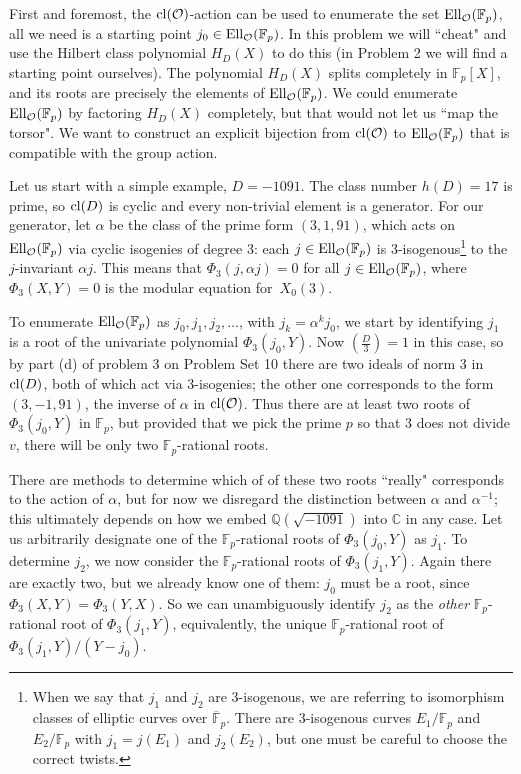 \documentclass[11pt]{article}
\newcommand{\Fp}{\mathbb{F}_p}
\newcommand{\Fpbar}{\overline{\mathbb{F}}_p}
\newcommand{\Q}{\mathbb{Q}}
\newcommand{\C}{\mathbb{C}}
\renewcommand{\O}{\mathcal{O}}
\newcommand{\EllO}{{\rm Ell}_\O}
\newcommand{\cl}{{\rm cl}}
\begin{document}
First and foremost, the $\cl(\O)$-action can be used to enumerate the set $\EllO(\Fp)$, all we need is a starting point $j_0\in\EllO(\Fp)$.
In this problem we will ``cheat" and use the Hilbert class polynomial $H_D(X)$ to do this (in Problem 2 we will find a starting point ourselves).
The polynomial $H_D(X)$ splits completely in $\Fp[X]$, and its roots are precisely the elements of $\EllO(\Fp)$.
We could enumerate $\EllO(\Fp)$ by factoring $H_D(X)$ completely, but that would not let us ``map the torsor".
We want to construct an explicit bijection from $\cl(\O)$ to $\EllO(\Fp)$ that is compatible with the group action.

Let us start with a simple example, $D=-1091$.  The class number $h(D)=17$ is prime, so $\cl(D)$ is cyclic and every non-trivial element is a generator.  For our generator, let $\alpha$ be the class of the prime form $(3,1,91)$, which acts on $\EllO(\Fp)$ via cyclic isogenies of degree 3: each $j\in\EllO(\Fp)$ is 3-isogenous\footnote{When we say that $j_1$ and $j_2$ are 3-isogenous, we are referring to isomorphism classes of elliptic curves over $\Fpbar$.  There are 3-isogenous curves $E_1/\Fp$ and $E_2/\Fp$ with $j_1=j(E_1)$ and $j_2(E_2)$, but one must be careful to choose the correct twists.} to the $j$-invariant $\alpha j$.
This means that $\Phi_3(j,\alpha j)=0$ for all $j\in\EllO(\Fp)$, where $\Phi_3(X,Y)=0$ is the modular equation for~$X_0(3)$.

To enumerate $\EllO(\Fp)$ as $j_0,j_1,j_2,\ldots$, with $j_k=\alpha^k j_0$, we start by identifying $j_1$ is a root of the univariate polynomial $\Phi_3(j_0,Y)$.
Now $\left(\frac{D}{3}\right)=1$ in this case, so by part (d) of problem 3 on Problem Set 10 there are two ideals of norm 3 in $\cl(D)$, both of which act via 3-isogenies; the other one corresponds to the form $(3,-1,91)$, the inverse of $\alpha$ in $\cl(\O)$.  Thus there are at least two roots of $\Phi_3(j_0,Y)$ in $\Fp$, but provided that we pick the prime $p$ so that $3$ does not divide $v$, there will be only two $\Fp$-rational roots.

There are methods to determine which of of these two roots ``really" corresponds to the action of $\alpha$, but for now we disregard the distinction between $\alpha$ and $\alpha^{-1}$; this ultimately depends on how we embed $\Q(\sqrt{-1091})$ into $\C$ in any case.  Let us arbitrarily designate one of the $\Fp$-rational roots of $\Phi_3(j_0,Y)$ as $j_1$.  To determine $j_2$, we now consider the $\Fp$-rational roots of $\Phi_3(j_1,Y)$.  Again there are exactly two, but we already know one of them: $j_0$ must be a root, since $\Phi_3(X,Y)=\Phi_3(Y,X)$.
So we can unambiguously identify $j_2$ as the \emph{other} $\Fp$-rational root of $\Phi_3(j_1,Y)$, equivalently, the unique $\Fp$-rational root of $\Phi_3(j_1,Y)/(Y-j_0)$.
\end{document}
